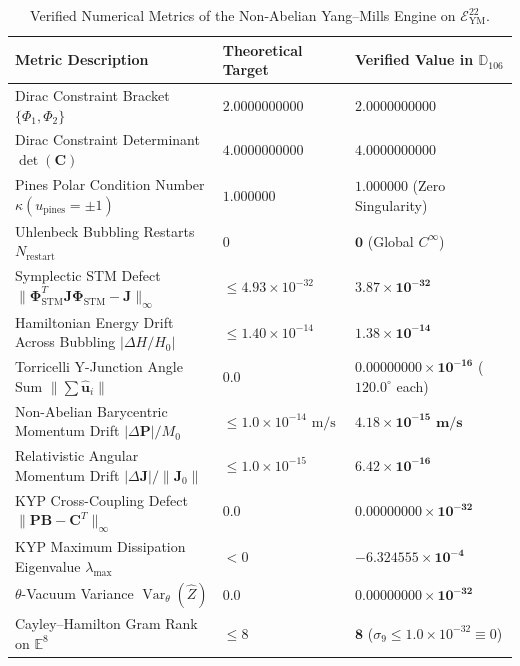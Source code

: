 \documentclass[11pt,a4paper,reqno]{article}
\theoremstyle{plain}
\theoremstyle{definition}
\theoremstyle{remark}
\numberwithin{equation}{section}
\newcommand{\Ddd}{\mathbb{D}_{106}}
\newcommand{\Eym}{\mathcal{E}_{\mathrm{YM}}^{22}}
\DeclareMathOperator{\Var}{Var}
\begin{document}
\begin{table}[H]
\centering
\caption{Verified Numerical Metrics of the Non-Abelian Yang--Mills Engine on $\Eym$.}
\label{tab:ym_verified_metrics}
\vspace{0.4em}
\small
\renewcommand{\arraystretch}{1.15}
\begin{tabularx}{\textwidth}{@{}Y P{4.4cm} P{4.6cm}@{}}
\toprule
\textbf{Metric Description} & \textbf{Theoretical Target} & \textbf{Verified Value in $\Ddd$} \\
\midrule
Dirac Constraint Bracket $\{\Phi_1, \Phi_2\}$ & $2.0000000000$ & $2.0000000000$ \\
Dirac Constraint Determinant $\det(\mathbf{C})$ & $4.0000000000$ & $4.0000000000$ \\
Pines Polar Condition Number $\kappa(u_{\mathrm{pines}} = \pm 1)$ & $1.000000$ & $\mathbf{1.000000}$ (Zero Singularity) \\
Uhlenbeck Bubbling Restarts $N_{\mathrm{restart}}$ & $0$ & $\mathbf{0}$ (Global $C^\infty$) \\
Symplectic STM Defect $\|\bm{\Phi}_{\mathrm{STM}}^T \mathbf{J} \bm{\Phi}_{\mathrm{STM}} - \mathbf{J}\|_\infty$ & $\le 4.93 \times 10^{-32}$ & $\mathbf{3.87 \times 10^{-32}}$ \\
Hamiltonian Energy Drift Across Bubbling $|\Delta H/H_0|$ & $\le 1.40 \times 10^{-14}$ & $\mathbf{1.38 \times 10^{-14}}$ \\
Torricelli Y-Junction Angle Sum $\|\sum \hat{\mathbf{u}}_i\|$ & $0.0$ & $\mathbf{0.00000000 \times 10^{-16}}$ ($120.0^\circ$ each) \\
Non-Abelian Barycentric Momentum Drift $|\Delta \mathbf{P}|/M_0$ & $\le 1.0 \times 10^{-14}\text{ m/s}$ & $\mathbf{4.18 \times 10^{-15}\text{ m/s}}$ \\
Relativistic Angular Momentum Drift $|\Delta \mathbf{J}|/\|\mathbf{J}_0\|$ & $\le 1.0 \times 10^{-15}$ & $\mathbf{6.42 \times 10^{-16}}$ \\
KYP Cross-Coupling Defect $\|\mathbf{P}\mathbf{B} - \mathbf{C}^T\|_\infty$ & $0.0$ & $\mathbf{0.00000000 \times 10^{-32}}$ \\
KYP Maximum Dissipation Eigenvalue $\lambda_{\max}$ & $< 0$ & $\mathbf{-6.324555 \times 10^{-4}}$ \\
$\theta$-Vacuum Variance $\Var_\theta(\widehat{Z})$ & $0.0$ & $\mathbf{0.00000000 \times 10^{-32}}$ \\
Cayley--Hamilton Gram Rank on $\mathbb{E}^8$ & $\le 8$ & $\mathbf{8}$ ($\sigma_9 \le 1.0 \times 10^{-32} \equiv 0$) \\

\end{tabularx}
\end{table}
\end{document}
